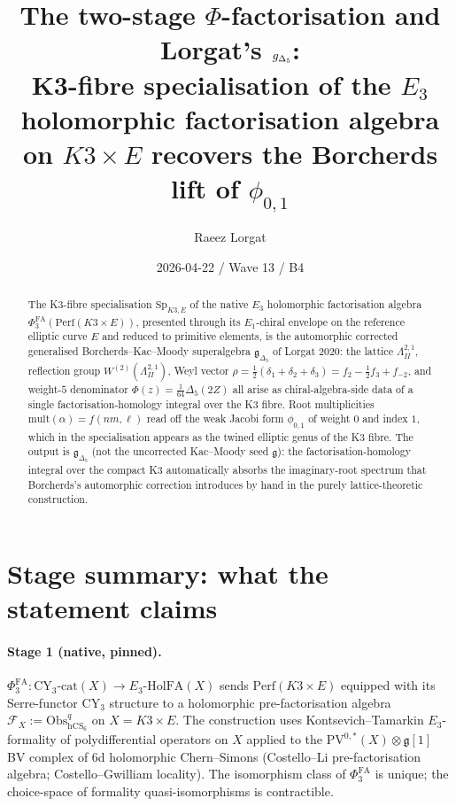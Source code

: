 \documentclass[11pt]{amsart}
\title{The two-stage \texorpdfstring{$\Phi$}{Phi}-factorisation and Lorgat's
\texorpdfstring{$\gDelta$}{g-Delta5}:\\ K3-fibre specialisation of the
$E_3$ holomorphic factorisation algebra on $K3\times E$ recovers the
Borcherds lift of $\phi_{0,1}$}
\author{Raeez Lorgat}
\date{2026-04-22 / Wave 13 / B4}
\providecommand{\cF}{\mathcal{F}}
\providecommand{\Obs}{\mathrm{Obs}}
\providecommand{\hCS}{\mathrm{hCS}}
\providecommand{\Perf}{\mathrm{Perf}}
\providecommand{\fg}{\mathfrak{g}}
\providecommand{\frakg}{\mathfrak{g}}
\providecommand{\gDelta}{\mathfrak{g}_{\Delta_5}}
\providecommand{\Lat}{\Lambda}
\providecommand{\WII}{W^{(2)}(\Lat^{2,1}_{II})}
\providecommand{\PV}{\mathrm{PV}}
\providecommand{\HolFA}{\mathrm{HolFA}}
\providecommand{\Sp}{\mathrm{Sp}}
\providecommand{\mult}{\mathrm{mult}}
\theoremstyle{plain}
\theoremstyle{definition}
\theoremstyle{remark}
\begin{document}
\maketitle

\begin{abstract}
The K3-fibre specialisation $\Sp_{K3,E}$ of the native $E_3$ holomorphic
factorisation algebra $\Phi^{\mathrm{FA}}_3(\Perf(K3\times E))$, presented
through its $E_1$-chiral envelope on the reference elliptic curve $E$ and
reduced to primitive elements, is the automorphic corrected generalised
Borcherds--Kac--Moody superalgebra $\gDelta$ of Lorgat 2020: the lattice
$\Lat^{2,1}_{II}$, reflection group $\WII$, Weyl vector
$\rho=\tfrac12(\delta_1+\delta_2+\delta_3)=f_2-\tfrac12 f_3+f_{-2}$, and
weight-$5$ denominator $\Phi(z)=\tfrac{1}{64}\Delta_5(2Z)$ all arise as
chiral-algebra-side data of a single factorisation-homology integral over
the K3 fibre. Root multiplicities $\mult(\alpha)=f(nm,\ell)$ read off the
weak Jacobi form $\phi_{0,1}$ of weight $0$ and index $1$, which in the
specialisation appears as the twined elliptic genus of the K3 fibre. The
output is $\gDelta$ (not the uncorrected Kac--Moody seed $\fg$): the
factorisation-homology integral over the compact K3 automatically
absorbs the imaginary-root spectrum that Borcherds's automorphic
correction introduces by hand in the purely lattice-theoretic
construction.
\end{abstract}

\section{Stage summary: what the statement claims}

\paragraph{Stage 1 (native, pinned).} $\Phi^{\mathrm{FA}}_3: \mathrm{CY}_3\text{-cat}(X) \to E_3\text{-}\HolFA(X)$
sends $\Perf(K3\times E)$ equipped with its Serre-functor CY$_3$ structure
to a holomorphic pre-factorisation algebra $\cF_X:=\Obs^{q}_{\hCS_6}$ on
$X=K3\times E$. The construction uses Kontsevich--Tamarkin $E_3$-formality
of polydifferential operators on $X$ applied to the $\PV^{0,\ast}(X)\otimes\frakg[1]$
BV complex of $6$d holomorphic Chern--Simons (Costello--Li pre-factorisation
algebra; Costello--Gwilliam locality). The isomorphism class of
$\Phi^{\mathrm{FA}}_3$ is unique; the choice-space of formality
quasi-isomorphisms is contractible.
\end{document}
